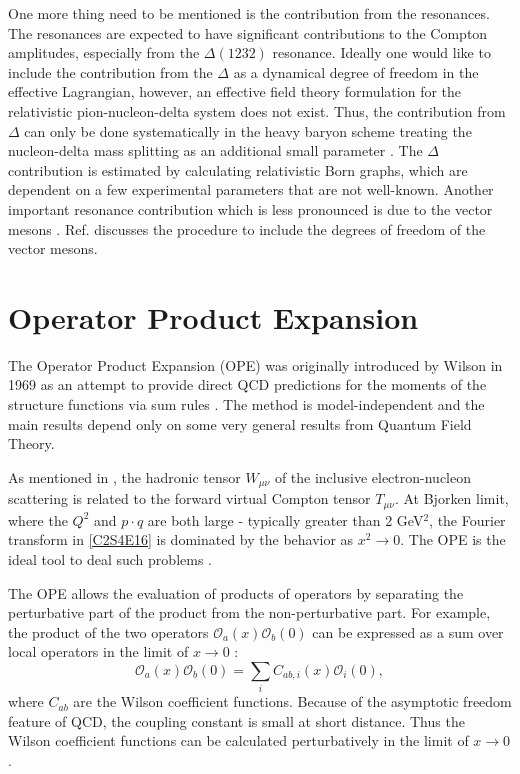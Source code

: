 One more thing need to be mentioned is the contribution from the resonances. The resonances are expected to have significant contributions to the Compton amplitudes, especially from the $\Delta(1232)$ resonance. Ideally one would like to include the contribution from the $\Delta$ as a dynamical degree of freedom in the effective Lagrangian, however, an effective field theory formulation for the relativistic pion-nucleon-delta system does not exist. Thus, the contribution from $\Delta$ can only be done systematically in the heavy baryon scheme treating the nucleon-delta mass splitting as an additional small parameter \cite{Hemmert1998}. The $\Delta$ contribution is estimated by calculating relativistic Born graphs, which are dependent on a few experimental parameters that are not well-known. Another important resonance contribution which is less pronounced is due to the vector mesons \cite{Bernard2003}. Ref. \cite{Kubis2001} discusses the procedure to include the degrees of freedom of the vector mesons.

\section{Operator Product Expansion}
\label{C3S2}

The Operator Product Expansion (OPE) was originally introduced by Wilson in 1969 as an attempt to provide direct QCD predictions for the moments of the structure functions via sum rules \cite{Wilson1969}. The method is model-independent and the main results depend only on some very general results from Quantum Field Theory.

As mentioned in , the hadronic tensor $W_{\mu\nu}$ of the inclusive electron-nucleon scattering is related to the forward virtual Compton tensor $T_{\mu\nu}$. At Bjorken limit, where the $Q^2$ and $p\cdot q$ are both large - typically greater than 2 GeV${}^2$, the Fourier transform in \cref{C2S4E16} is dominated by the behavior as $x^2\rightarrow 0$. The OPE is the ideal tool to deal such problems \cite{Thomas2001}.

The OPE allows the evaluation of products of operators by separating the perturbative part of the product from the non-perturbative part. For example, the product of the two operators $\mathcal{O}_a(x)\mathcal{O}_b(0)$ can be expressed as a sum over local operators in the limit of $x\rightarrow 0$ \cite{Manohar1992}:
\begin{equation} \label{C3S2E1}
\mathcal{O}_a(x)\mathcal{O}_b(0) = \sum_iC_{ab,i}(x)\mathcal{O}_i(0),
\end{equation}
where $C_{ab}$ are the Wilson coefficient functions. Because of the asymptotic freedom feature of QCD, the coupling constant is small at short distance. Thus the Wilson coefficient functions can be calculated perturbatively in the limit of $x\rightarrow 0$.

